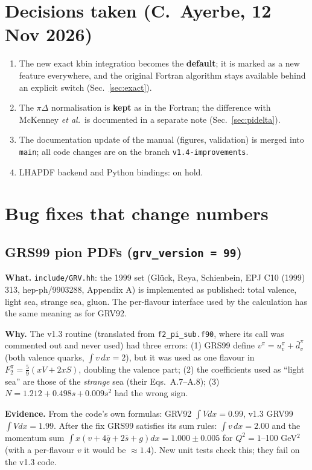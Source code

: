 \documentclass[11pt,a4paper]{article}
\newcommand{\key}[1]{\texttt{\textbf{#1}}}
\begin{document}
\section{Decisions taken (C.~Ayerbe, 12 Nov 2026)}
\begin{enumerate}
\item The new exact kbin integration becomes the \textbf{default}; it is
  marked as a new feature everywhere, and the original Fortran algorithm stays
  available behind an explicit switch (Sec.~\ref{sec:exact}).
\item The $\pi\Delta$ normalisation is \textbf{kept} as in the Fortran; the
  difference with McKenney \textit{et al.}\ is documented in a separate note
  (Sec.~\ref{sec:pidelta}).
\item The documentation update of the manual (figures, validation) is merged
  into \texttt{main}; all code changes are on the branch
  \texttt{v1.4-improvements}.
\item LHAPDF backend and Python bindings: on hold.
\end{enumerate}

\section{Bug fixes that change numbers}

\subsection{GRS99 pion PDFs (\key{grv\_version = 99})}
\textbf{What.} \texttt{include/GRV.hh}: the 1999 set (Gl\"uck, Reya,
Schienbein, EPJ C10 (1999) 313, hep-ph/9903288, Appendix A) is implemented as
published: total valence, light sea, strange sea, gluon.  The per-flavour
interface used by the calculation has the same meaning as for GRV92.

\textbf{Why.} The v1.3 routine (translated from \texttt{f2\_pi\_sub.f90},
where its call was commented out and never used) had three errors:
(1) GRS99 define $v^\pi=u_v^\pi+\bar d_v^\pi$ (both valence quarks,
$\int v\,dx=2$), but it was used as one flavour in
$F_2^\pi=\tfrac59(xV+2xS)$, doubling the valence part;
(2) the coefficients used as ``light sea'' are those of the \emph{strange}
sea (their Eqs.~A.7--A.8); (3) $N=1.212+0.498s\,\mathbf{+}\,0.009s^2$ had the
wrong sign.

\textbf{Evidence.} From the code's own formulas: GRV92 $\int V dx=0.99$,
v1.3 GRV99 $\int V dx=1.99$.  After the fix GRS99 satisfies its sum rules:
$\int v\,dx=2.00$ and the momentum sum $\int x(v+4\bar q+2\bar s+g)dx=1.000\pm0.005$
for $Q^2=1$--100 GeV$^2$ (with a per-flavour $v$ it would be $\approx1.4$).
New unit tests check this; they fail on the v1.3 code.
\end{document}
